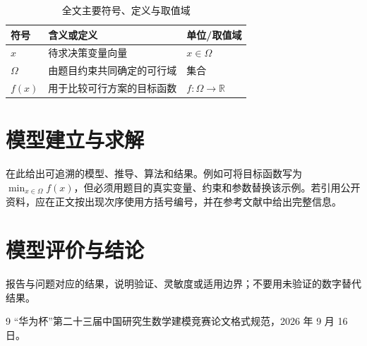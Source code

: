 \documentclass[bwprint]{gmcmthesis}
\begin{document}
\begin{table}[htbp]
  \centering
  \caption{全文主要符号、定义与取值域}
  \label{tab:main-symbols}
  \begin{tabularx}{\textwidth}{>{\centering\arraybackslash}p{}X>{\centering\arraybackslash}p{}}
    \toprule
    符号 & 含义或定义 & 单位/取值域 \\
    \midrule
    $x$ & 待求决策变量向量 & $x\in\Omega$ \\
    $\Omega$ & 由题目约束共同确定的可行域 & 集合 \\
    $f(x)$ & 用于比较可行方案的目标函数 & $f:\Omega\to\mathbb{R}$ \\
    \bottomrule
  \end{tabularx}
\end{table}

\section{模型建立与求解}
在此给出可追溯的模型、推导、算法和结果。例如可将目标函数写为 \(\min_{x\in\Omega} f(x)\)，但必须用题目的真实变量、约束和参数替换该示例。若引用公开资料，应在正文按出现次序使用方括号编号，并在参考文献中给出完整信息。

\section{模型评价与结论}
报告与问题对应的结果，说明验证、灵敏度或适用边界；不要用未验证的数字替代结果。

\clearpage
\begin{thebibliography}{9}
“华为杯”第二十三届中国研究生数学建模竞赛论文格式规范，2026 年 9 月 16 日。
\end{thebibliography}
\end{document}
